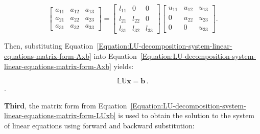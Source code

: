 \begin{equation}
	\begin{bmatrix}
		a_{11} & a_{12} & a_{13} \\
		a_{21} & a_{22} & a_{23} \\
		a_{31} & a_{32} & a_{33}
	\end{bmatrix}
	=
	\begin{bmatrix}
		l_{11} & 0      & 0          \\
		l_{21} & l_{22} & 0          \\
		l_{31} & l_{32} & l_{33}
	\end{bmatrix}
	\begin{bmatrix}
		u_{11} & u_{12} & u_{13} \\
		0      & u_{22} & u_{23} \\
		0      & 0      & u_{33}
	\end{bmatrix}.
\end{equation}

Then, substituting Equation~\ref{Equation:LU-decomposition-system-linear-equations-matrix-form-Axb} into Equation~\ref{Equation:LU-decomposition-system-linear-equations-matrix-form-Axb} yields:

\begin{equation}\label{Equation:LU-decomposition-system-linear-equations-matrix-form-LUxb}
	\mathbb{LU}\textbf{x} = \textbf{b}\,.
\end{equation}.

\par \textbf{Third}, the matrix form from Equation~\ref{Equation:LU-decomposition-system-linear-equations-matrix-form-LUxb} is used to obtain the solution to the system of linear equations using forward and backward substitution:

